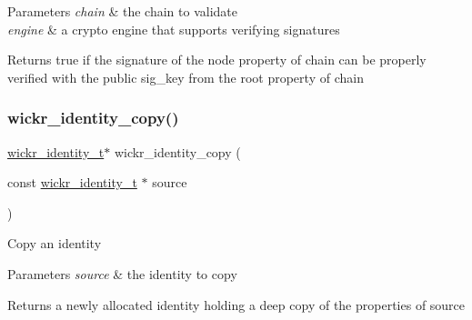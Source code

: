 \begin{DoxyParams}{Parameters}
{\em chain} & the chain to validate \\
\hline
{\em engine} & a crypto engine that supports verifying signatures \\
\hline
\end{DoxyParams}
\begin{DoxyReturn}{Returns}
true if the \textquotesingle{}signature\textquotesingle{} of the \textquotesingle{}node\textquotesingle{} property of \textquotesingle{}chain\textquotesingle{} can be properly verified with the public \textquotesingle{}sig\+\_\+key\textquotesingle{} from the \textquotesingle{}root\textquotesingle{} property of \textquotesingle{}chain\textquotesingle{} 
\end{DoxyReturn}
\mbox{\label{group__wickr__identity_ga14d1fb3ddd1dbd7797eb9b628eef99fe}} 
\subsubsection{\texorpdfstring{wickr\+\_\+identity\+\_\+copy()}{wickr\_identity\_copy()}}
{\footnotesize\ttfamily \mbox{\hyperlink{structwickr__identity}{wickr\+\_\+identity\+\_\+t}}$\ast$ wickr\+\_\+identity\+\_\+copy (\begin{DoxyParamCaption}\item[{const \mbox{\hyperlink{structwickr__identity}{wickr\+\_\+identity\+\_\+t}} $\ast$}]{source }\end{DoxyParamCaption})}

Copy an identity


\begin{DoxyParams}{Parameters}
{\em source} & the identity to copy \\
\hline
\end{DoxyParams}
\begin{DoxyReturn}{Returns}
a newly allocated identity holding a deep copy of the properties of \textquotesingle{}source\textquotesingle{} 
\end{DoxyReturn}
\mbox{\label{group__wickr__identity_ga75bfef275a250a32784231e8c042913b}} 
